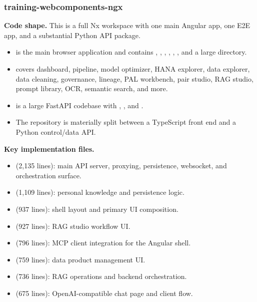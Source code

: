 \documentclass[11pt,a4paper]{article}
\begin{document}
\subsubsection{training-webcomponents-ngx}

\textbf{Code shape.} This is a full Nx workspace with one main Angular app, one E2E app, and a substantial Python API package.
\begin{itemize}[leftmargin=*]
    \item {} is the main browser application and contains , , , , , , and a large  directory.
    \item {} covers dashboard, pipeline, model optimizer, HANA explorer, data explorer, data cleaning, governance, lineage, PAL workbench, pair studio, RAG studio, prompt library, OCR, semantic search, and more.
    \item {} is a large FastAPI codebase with , , and .
    \item The repository is materially split between a TypeScript front end and a Python control/data API.
\end{itemize}

\textbf{Key implementation files.}
\begin{itemize}[leftmargin=*]
    \item {} (2,135 lines): main API server, proxying, persistence, websocket, and orchestration surface.
    \item {} (1,109 lines): personal knowledge and persistence logic.
    \item {} (937 lines): shell layout and primary UI composition.
    \item {} (927 lines): RAG studio workflow UI.
    \item {} (796 lines): MCP client integration for the Angular shell.
    \item {} (759 lines): data product management UI.
    \item {} (736 lines): RAG operations and backend orchestration.
    \item {} (675 lines): OpenAI-compatible chat page and client flow.
\end{itemize}
\end{document}
